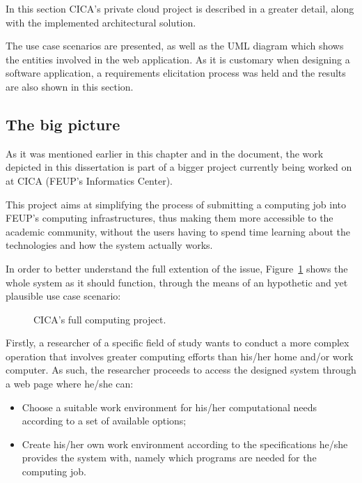 In this section CICA's private cloud project is described in a greater detail, along with the implemented architectural solution.

The use case scenarios are presented, as well as the UML diagram which shows the entities involved in the web application. As it is customary when designing a software application, a requirements elicitation process was held and the results are also shown in this section.

\subsection{The big picture}\label{subsec:bigpicture}

As it was mentioned earlier in this chapter and in the document, the work depicted in this dissertation is part of a bigger project currently being worked on at CICA (FEUP's Informatics Center).

This project aims at simplifying the process of submitting a computing job into FEUP's computing infrastructures, thus making them more accessible to the academic community, without the users having to spend time learning about the technologies and how the system actually works.

In order to better understand the full extention of the issue, Figure~\ref{fig:big_picture} shows the whole system as it should function, through the means of an hypothetic and yet plausible use case scenario:

\begin{figure}[h!]
  \begin{center}
    \leavevmode
    \caption{CICA's full computing project.}
    \label{fig:big_picture}
  \end{center}
\end{figure}

Firstly, a researcher of a specific field of study wants to conduct a more complex operation that involves greater computing efforts than his/her home and/or work computer. As such, the researcher proceeds to access the designed system through a web page where he/she can:

\begin{itemize}
	\item Choose a suitable work environment for his/her computational needs according to a set of available options;
	\item Create his/her own work environment according to the specifications he/she provides the system with, namely which programs are needed for the computing job.
\end{itemize}

